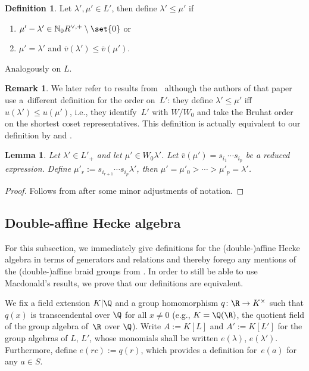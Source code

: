 \documentclass[pdftex]{sigma}
\newtheorem{Lemma}[Theorem]{Lemma}
\theoremstyle{definition}
\newtheorem{Definition}[Theorem]{Definition}
\newtheorem{Remark}[Theorem]{Remark}
\numberwithin{equation}{section}
\begin{document}
\begin{Definition}
 Let $\lambda',\mu'\in L'$, then define $\lambda'\le\mu'$ if
 \begin{enumerate}\itemsep=0pt
 \item[(i)] $\mu'-\lambda'\in\mathbb{N}_0 R^{\vee,+}\setminus\set{0}$ or
 \item[(ii)] $\mu'=\lambda'$ and $\overline{v}(\lambda')\le\overline{v}(\mu')$.
 \end{enumerate}
 Analogously on $L$.
\end{Definition}

\begin{Remark}
 We later refer to results from~\cite{stokmanInduced} although the authors
 of that paper use a~different definition for the order on~$L'$: they define
 $\lambda'\le\mu'$ iff $u(\lambda')\le u(\mu')$, i.e., they identify~$L'$
 with $W/W_0$ and take the Bruhat order on the shortest coset representatives.
 This definition is actually equivalent to our definition by
\cite[Proposition~5.21]{stokmanInduced} and \cite[Section~2.7.13]{macdonald}.
\end{Remark}

\begin{Lemma}\label{sec:lem-order-interval}
 Let $\lambda'\in L'_+$ and let $\mu'\in W_0\lambda'$. Let
 $\overline{v}(\mu')=s_{i_1}\cdots s_{i_p}$ be a reduced expression. Define
 $\mu'_r := s_{i_{r+1}}\cdots s_{i_p}\lambda'$, then
$
 \mu'=\mu'_0>\cdots>\mu'_p = \lambda'$.
\end{Lemma}
\begin{proof}
 Follows from \cite[Section~2.7.10\,(ii)]{macdonald} after some minor adjustments
 of notation.
\end{proof}

\subsection{Double-affine Hecke algebra}
For this subsection, we immediately give definitions for the (double-)affine
Hecke algebra in terms of generators and relations and thereby forego any mentions of the (double-)affine braid groups from \cite[Section~3]{macdonald}.
In order to still be able to use Macdonald's results, we prove that our definitions are equivalent.

We fix a field extension $K|\Q$ and a group homomorphism $q\colon \R\to K^\times$ such that $q(x)$ is transcendental over $\Q$ for all $x\ne0$
(e.g., $K=\Q(\R)$, the quotient field of the group algebra of~$\R$ over $\Q$). Write $A:= K[L]$ and $A':= K[L']$
for the group algebras of $L$, $L'$, whose monomials shall be written $e(\lambda)$, $e(\lambda')$. Furthermore, define $e(rc):=q(r)$, which provides
a definition for~$e(a)$ for any $a\in S$.
\end{document}
